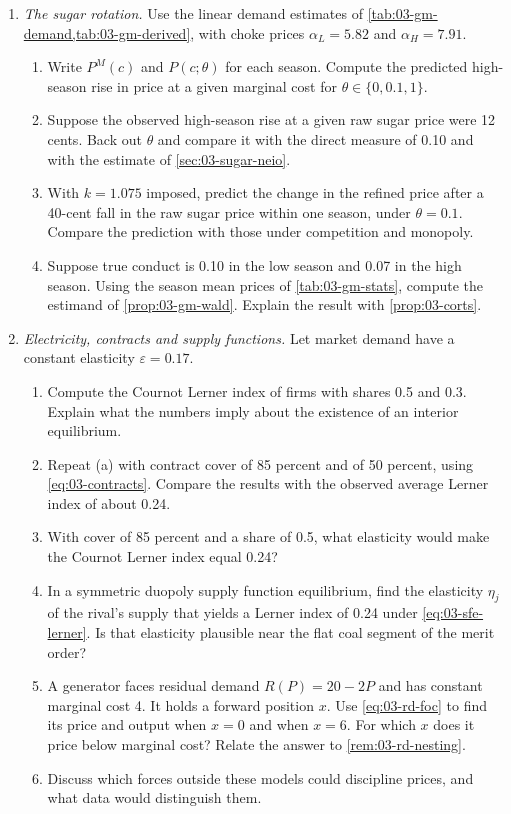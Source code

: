 \begin{enumerate}[label=\arabic*., leftmargin=*, itemsep=6pt]
\item \textit{The sugar rotation.} Use the linear demand estimates of \cref{tab:03-gm-demand,tab:03-gm-derived}, with
choke prices $\alpha_L = 5.82$ and $\alpha_H = 7.91$.
\begin{enumerate}[label=(\alph*)]
  \item Write $P^M(c)$ and $P(c; \theta)$ for each season. Compute the predicted high-season rise in price at a given
  marginal cost for $\theta \in \{0, 0.1, 1\}$.
  \item Suppose the observed high-season rise at a given raw sugar price were 12 cents. Back out $\theta$ and compare it
  with the direct measure of 0.10 and with the estimate of \cref{sec:03-sugar-neio}.
  \item With $k = 1.075$ imposed, predict the change in the refined price after a 40-cent fall in the raw sugar price
  within one season, under $\theta = 0.1$. Compare the prediction with those under competition and monopoly.
  \item Suppose true conduct is 0.10 in the low season and 0.07 in the high season. Using the season mean prices of
  \cref{tab:03-gm-stats}, compute the estimand of \cref{prop:03-gm-wald}. Explain the result with \cref{prop:03-corts}.
\end{enumerate}

\item \textit{Electricity, contracts and supply functions.} Let market demand have a constant elasticity
$\varepsilon = 0.17$.
\begin{enumerate}[label=(\alph*)]
  \item Compute the Cournot Lerner index of firms with shares 0.5 and 0.3. Explain what the numbers imply about the
  existence of an interior equilibrium.
  \item Repeat (a) with contract cover of 85 percent and of 50 percent, using \eqref{eq:03-contracts}. Compare the
  results with the observed average Lerner index of about 0.24.
  \item With cover of 85 percent and a share of 0.5, what elasticity would make the Cournot Lerner index equal 0.24?
  \item In a symmetric duopoly supply function equilibrium, find the elasticity $\eta_j$ of the rival's supply that
  yields a Lerner index of 0.24 under \eqref{eq:03-sfe-lerner}. Is that elasticity plausible near the flat coal segment
  of the merit order?
  \item A generator faces residual demand $R(P) = 20 - 2P$ and has constant marginal cost 4. It holds a forward
  position $x$. Use \eqref{eq:03-rd-foc} to find its price and output when $x = 0$ and when $x = 6$. For which $x$
  does it price below marginal cost? Relate the answer to \cref{rem:03-rd-nesting}.
  \item Discuss which forces outside these models could discipline prices, and what data would distinguish them.
\end{enumerate}

\end{enumerate}
